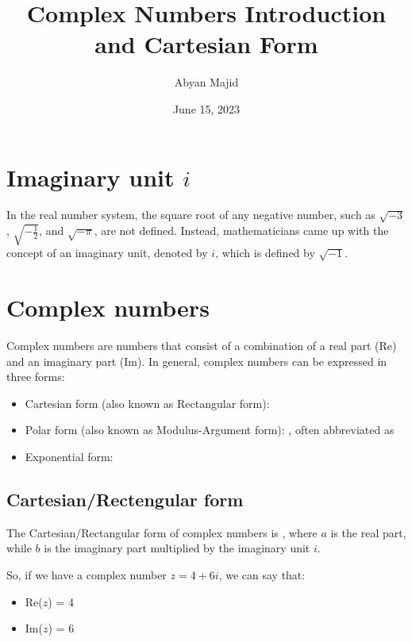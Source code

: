 \documentclass{article}
\begin{document}
\title{Complex Numbers Introduction and Cartesian Form}
\author{Abyan Majid}
\date{June 15, 2023}
\maketitle

\section{Imaginary unit $i$}

In the real number system, the square root of any negative number, such as $\sqrt{-3}$, $\sqrt{{-\frac{1}{2}}}$, and $\sqrt{-\pi}$, are not defined. Instead, mathematicians came up with the concept of an imaginary unit, denoted by $i$, which is defined by $\sqrt{-1}$.
\begin{center}
\end{center}

\section{Complex numbers}
Complex numbers are numbers that consist of a combination of a real part (Re) and an imaginary part (Im). In general, complex numbers can be expressed in three forms:
\begin{itemize}
    \item Cartesian form (also known as Rectangular form): 
    \item Polar form (also known as Modulus-Argument form): , often abbreviated as 
    \item Exponential form: 
\end{itemize}

\subsection{Cartesian/Rectengular form}
The Cartesian/Rectangular form of complex numbers is , where $a$ is the real part, while $b$ is the imaginary part multiplied by the imaginary unit $i$.

\vspace{\baselineskip}

\noindent So, if we have a complex number $z=4+6i$, we can say that:
\begin{itemize}
    \item Re($z$) = 4
    \item Im($z$) = 6
\end{itemize}
\end{document}
